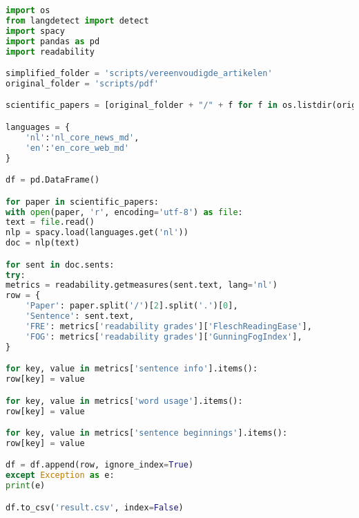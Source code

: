 \newpage

\begin{center}
	\begin{lstlisting}[language=Python, caption={Script voor fase 4 van de vergelijkende studie}, label={code:verg-studie-phase-4}]
import os
from langdetect import detect
import spacy
import pandas as pd
import readability

simplified_folder = 'scripts/vereenvoudigde_artikelen'
original_folder = 'scripts/pdf'

scientific_papers = [original_folder + "/" + f for f in os.listdir(original_folder)] + [simplified_folder + "/" + f for f in os.listdir(simplified_folder)]

languages = {
	'nl':'nl_core_news_md',
	'en':'en_core_web_md'
}

df = pd.DataFrame()

for paper in scientific_papers:
with open(paper, 'r', encoding='utf-8') as file:
text = file.read()
nlp = spacy.load(languages.get('nl'))
doc = nlp(text)

for sent in doc.sents:
try:
metrics = readability.getmeasures(sent.text, lang='nl')
row = {
	'Paper': paper.split('/')[2].split('.')[0],
	'Sentence': sent.text,
	'FRE': metrics['readability grades']['FleschReadingEase'],
	'FOG': metrics['readability grades']['GunningFogIndex'],
}

for key, value in metrics['sentence info'].items():
row[key] = value

for key, value in metrics['word usage'].items():
row[key] = value

for key, value in metrics['sentence beginnings'].items():
row[key] = value

df = df.append(row, ignore_index=True)
except Exception as e:
print(e)

df.to_csv('result.csv', index=False)
	\end{lstlisting}
\end{center}
